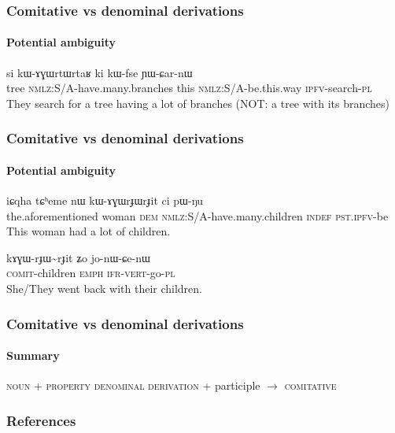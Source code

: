 \documentclass[xcolor=table]{beamer}
\newcommand{\ipa}[1]{{\phon \mbox{#1}}} %
\begin{document}
\begin{frame} 
\frametitle{Comitative vs denominal derivations} 
\framesubtitle{Potential ambiguity}  
\begin{exe}
\ex
\gll   
  \ipa{si} 	\ipa{kɯ-ɤɣɯrtɯrtaʁ} 	\ipa{ki} 	\ipa{kɯ-fse} 	\ipa{ɲɯ-ɕar-nɯ} \\
  tree \textsc{nmlz}:S/A-have.many.branches this \textsc{nmlz}:S/A-be.this.way \textsc{ipfv}-search-\textsc{pl} \\
\glt They search for a tree having a lot of branches (NOT: a tree with its branches)
\end{exe}
  \end{frame}    

\begin{frame} 
\frametitle{Comitative vs denominal derivations} 
\framesubtitle{Potential ambiguity}  

\begin{exe}
\ex
\gll   
\ipa{iɕqha} 	\ipa{tɕʰeme} 	\ipa{nɯ} 	\ipa{kɯ-ɤɣɯrɟɯrɟit} 	\ipa{ci} 	\ipa{pɯ-ŋu}  \\
the.aforementioned woman \textsc{dem} \textsc{nmlz}:S/A-have.many.children \textsc{indef} \textsc{pst.ipfv}-be \\
\glt This woman had a lot of children.
\end{exe}

\begin{exe}
\ex
\gll   
\ipa{kɤɣɯ-rɟɯ\textasciitilde{}rɟit} 	\ipa{ʑo} 	\ipa{jo-nɯ-ɕe-nɯ} \\
\textsc{comit}-children \textsc{emph} \textsc{ifr-vert}-go-\textsc{pl} \\
\glt She/They went back with their children.
\end{exe}
  \end{frame}    
  
     \begin{frame} 
\frametitle{Comitative vs denominal derivations} 
\framesubtitle{Summary}
 \begin{exe}
\ex
 \glt  \textsc{noun} + \textsc{property denominal derivation} + participle $\rightarrow$ \textsc{comitative}
\end{exe} 


 \end{frame}    
 
 
 \begin{frame} 
 \frametitle{References}
 \tiny
 

 \end{frame}
\end{document}
